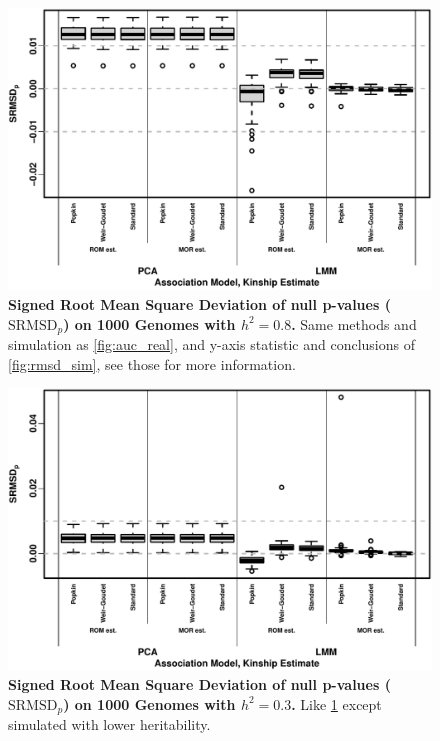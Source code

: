 \documentclass[11pt]{article}
\newcommand{\rmsd}{\text{SRMSD}_p}
\begin{document}
\begin{figure}[hp!]
  \centering
  \includegraphics[width=\textwidth]{tgp-nygc-autosomes_ld_prune_1000kb_0.3_maf-0.01/rmsd.pdf}
  \caption{
    {\bf Signed Root Mean Square Deviation of null p-values ($\rmsd$) on 1000 Genomes with $h^2=0.8$.}
    Same methods and simulation as \cref{fig:auc_real}, and y-axis statistic and conclusions of \cref{fig:rmsd_sim}, see those for more information.
  }
  \label{fig:rmsd_real}
\end{figure}

\begin{figure}[hp!]
  \centering
  \includegraphics[width=\textwidth]{tgp-nygc-autosomes_ld_prune_1000kb_0.3_maf-0.01/h-0.3/rmsd.pdf}
  \caption{
    {\bf Signed Root Mean Square Deviation of null p-values ($\rmsd$) on 1000 Genomes with $h^2=0.3$.}
    Like \cref{fig:rmsd_real} except simulated with lower heritability.
  }
  \label{fig:rmsd_real-h3}
\end{figure}
\end{document}
